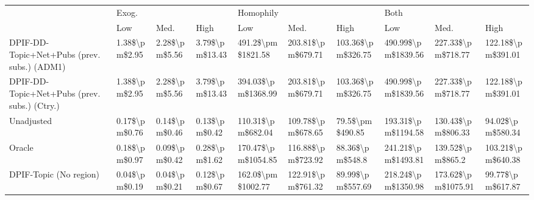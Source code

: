 \begin{tabular}{llllllllll}
\toprule
{} & \multicolumn{3}{l}{Exog.} & \multicolumn{3}{l}{Homophily} & \multicolumn{3}{l}{Both} \\
{} &            Low &           Med. &            High &                 Low &               Med. &               High &                 Low &                Med. &               High \\
\midrule
DPIF-DD-Topic+Net+Pubs (prev. subs.) (ADM1)  &  1.38\$\textbackslash pm\$2.95 &  2.28\$\textbackslash pm\$5.56 &  3.79\$\textbackslash pm\$13.43 &   491.2\$\textbackslash pm\$1821.58 &  203.81\$\textbackslash pm\$679.71 &  103.36\$\textbackslash pm\$326.75 &  490.99\$\textbackslash pm\$1839.56 &   227.33\$\textbackslash pm\$718.77 &  122.18\$\textbackslash pm\$391.01 \\
DPIF-DD-Topic+Net+Pubs (prev. subs.) (Ctry.) &  1.38\$\textbackslash pm\$2.95 &  2.28\$\textbackslash pm\$5.56 &  3.79\$\textbackslash pm\$13.43 &  394.03\$\textbackslash pm\$1368.99 &  203.81\$\textbackslash pm\$679.71 &  103.36\$\textbackslash pm\$326.75 &  490.99\$\textbackslash pm\$1839.56 &   227.33\$\textbackslash pm\$718.77 &  122.18\$\textbackslash pm\$391.01 \\
Unadjusted                                   &  0.17\$\textbackslash pm\$0.76 &  0.14\$\textbackslash pm\$0.46 &   0.13\$\textbackslash pm\$0.42 &   110.31\$\textbackslash pm\$682.04 &  109.78\$\textbackslash pm\$678.65 &    79.5\$\textbackslash pm\$490.85 &  193.31\$\textbackslash pm\$1194.58 &   130.43\$\textbackslash pm\$806.33 &   94.02\$\textbackslash pm\$580.34 \\
Oracle                                       &  0.18\$\textbackslash pm\$0.97 &  0.09\$\textbackslash pm\$0.42 &   0.28\$\textbackslash pm\$1.62 &  170.47\$\textbackslash pm\$1054.85 &  116.88\$\textbackslash pm\$723.92 &    88.36\$\textbackslash pm\$548.8 &  241.21\$\textbackslash pm\$1493.81 &    139.52\$\textbackslash pm\$865.2 &  103.21\$\textbackslash pm\$640.38 \\
DPIF-Topic (No region)                       &  0.04\$\textbackslash pm\$0.19 &  0.04\$\textbackslash pm\$0.21 &   0.12\$\textbackslash pm\$0.67 &   162.0\$\textbackslash pm\$1002.77 &  122.91\$\textbackslash pm\$761.32 &   89.99\$\textbackslash pm\$557.69 &  218.24\$\textbackslash pm\$1350.98 &  173.62\$\textbackslash pm\$1075.91 &   99.77\$\textbackslash pm\$617.87 \\
\bottomrule
\end{tabular}
